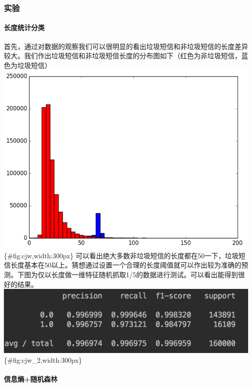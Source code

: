 \subsubsection{实验}\label{ux5b9eux9a8c}

\paragraph{长度统计分类}\label{ux957fux5ea6ux7edfux8ba1ux5206ux7c7b}

首先，通过对数据的观察我们可以很明显的看出垃圾短信和非垃圾短信的长度差异较大。我们作出垃圾短信和非垃圾短信长度的分布图如下（红色为非垃圾短信，蓝色为垃圾短信）
\includegraphics{./images/cjw-1.png}\{\#fig:cjw,width:300px\}
可以看出绝大多数非垃圾短信的长度都在50一下，垃圾短信长度基本在50以上。猜想通过设置一个合理的长度阈值就可以作出较为准确的预测。下图为仅以长度做一维特征随机抓取1/5的数据进行测试。可以看出能得到很好的结果。
\includegraphics{./images/cjw-2.png}\{\#fig:cjw\_2,width:300px\}

\paragraph{信息熵+随机森林}\label{ux4fe1ux606fux71b5ux968fux673aux68eeux6797}

